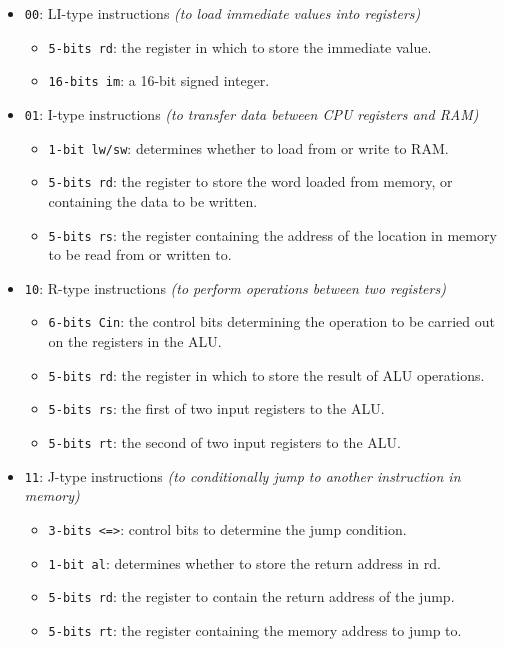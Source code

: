 \begin{itemize}
    \item \texttt{00}: LI-type instructions \textit{(to load immediate values into registers)}
        \begin{itemize}
            \item \texttt{5-bits rd}: the register in which to store the immediate value.
            \item \texttt{16-bits im}: a 16-bit signed integer.
        \end{itemize}
    \item \texttt{01}: I-type instructions \textit{(to transfer data between CPU registers and RAM)}
        \begin{itemize}
            \item \texttt{1-bit lw/sw}: determines whether to load from or write to RAM.
            \item \texttt{5-bits rd}: the register to store the word loaded from memory, or containing the data to be written.
            \item \texttt{5-bits rs}: the register containing the address of the location in memory to be read from or written to.
        \end{itemize}
    \item \texttt{10}: R-type instructions \textit{(to perform operations between two registers)}
        \begin{itemize}
            \item \texttt{6-bits Cin}: the control bits determining the operation to be carried out on the registers in the ALU.
            \item \texttt{5-bits rd}: the register in which to store the result of ALU operations.
            \item \texttt{5-bits rs}: the first of two input registers to the ALU.
            \item \texttt{5-bits rt}: the second of two input registers to the ALU.
        \end{itemize}
    \item \texttt{11}: J-type instructions \textit{(to conditionally jump to another instruction in memory)}
        \begin{itemize}
            \item \texttt{3-bits <=>}: control bits to determine the jump condition.
            \item \texttt{1-bit al}: determines whether to store the return address in rd.
            \item \texttt{5-bits rd}: the register to contain the return address of the jump.
            \item \texttt{5-bits rt}: the register containing the memory address to jump to.
        \end{itemize}
\end{itemize}
 
